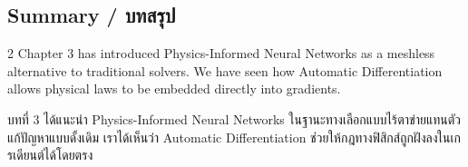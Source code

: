 \subsection{Summary \quad / \quad \textthai{บทสรุป}}
\begin{paracol}{2}
Chapter 3 has introduced Physics-Informed Neural Networks as a meshless alternative to traditional solvers. We have seen how Automatic Differentiation allows physical laws to be embedded directly into gradients.

\switchcolumn

\begin{thai}
บทที่ 3 ได้แนะนำ Physics-Informed Neural Networks ในฐานะทางเลือกแบบไร้ตาข่ายแทนตัวแก้ปัญหาแบบดั้งเดิม เราได้เห็นว่า Automatic Differentiation ช่วยให้กฎทางฟิสิกส์ถูกฝังลงในเกรเดียนต์ได้โดยตรง
\end{thai}
\end{paracol}
